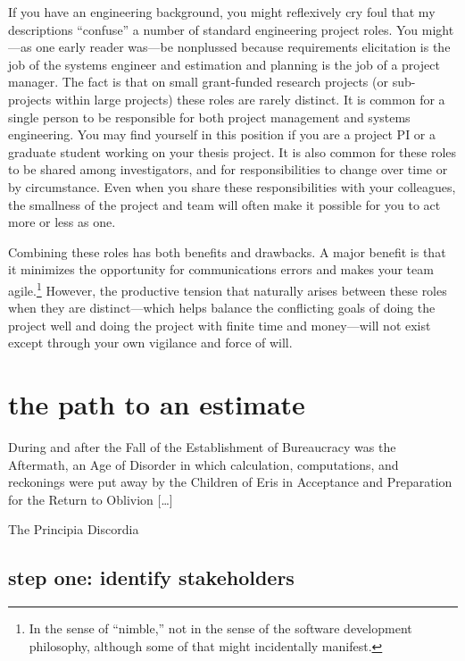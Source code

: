 \documentclass[12pt,oneside]{book}
\begin{document}
If you have an engineering background, you might reflexively cry foul that my descriptions ``confuse'' a number of standard engineering project roles. You might---as one early reader was---be nonplussed because requirements elicitation is the job of the systems engineer and estimation and planning is the job of a project manager. The fact is that on small grant-funded research projects (or sub-projects within large projects) these roles are rarely distinct. It is common for a single person to be responsible for both project management and systems engineering. You may find yourself in this position if you are a project PI or a graduate student working on your thesis project. It is also common for these roles to be shared among investigators, and for responsibilities to change over time or by circumstance. Even when you share these responsibilities with your colleagues, the smallness of the project and team will often make it possible for you to act more or less as one.

Combining these roles has both benefits and drawbacks. A major benefit is that it minimizes the opportunity for communications errors and makes your team agile.\footnote{
In the sense of ``nimble,'' not in the sense of the software development philosophy, although some of that might incidentally manifest.}
However, the productive tension that naturally arises between these roles when they are distinct---which helps balance the conflicting goals of doing the project well and doing the project with finite time and money---will not exist except through your own vigilance and force of will.

\chapter*{the path to an estimate}

\epigraph{During and after the Fall of the Establishment of Bureaucracy was the Aftermath, an Age of Disorder in which calculation, computations, and reckonings were put away by the Children of Eris in Acceptance and Preparation for the Return to Oblivion [{\dots}]}{The Principia Discordia}

\section*{step one: identify stakeholders}
\end{document}
